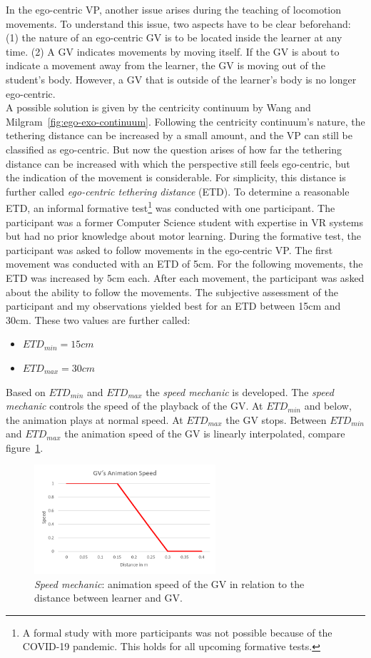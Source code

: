 In the ego-centric VP, another issue arises during the teaching of locomotion movements. To understand this issue, two aspects have to be clear beforehand: (1) the nature of an ego-centric GV is to be located inside the learner at any time. (2) A GV indicates movements by moving itself. If the GV is about to indicate a movement away from the learner, the GV is moving out of the student's body. However, a GV that is outside of the learner's body is no longer ego-centric.\\
A possible solution is given by the centricity continuum by Wang and Milgram~\ref{fig:ego-exo-continuum}. Following the centricity continuum's nature, the tethering distance can be increased by a small amount, and the VP can still be classified as ego-centric. But now the question arises of how far the tethering distance can be increased with which the perspective still feels ego-centric, but the indication of the movement is considerable. For simplicity, this distance is further called \textit{ego-centric tethering distance} (ETD). To determine a reasonable ETD, an informal formative test\footnote{A formal study with more participants was not possible because of the COVID-19 pandemic. This holds for all upcoming formative tests.} was conducted with one participant. The participant was a former Computer Science student with expertise in VR systems but had no prior knowledge about motor learning. During the formative test, the participant was asked to follow movements in the ego-centric VP. The first movement was conducted with an ETD of 5cm. For the following movements, the ETD was increased by 5cm each. After each movement, the participant was asked about the ability to follow the movements. The subjective assessment of the participant and my observations yielded best for an ETD between 15cm and 30cm. These two values are further called:
\begin{itemize}
	\item[] $ETD_{min}=15cm$
	\item[] $ETD_{max}=30cm$
\end{itemize}
Based on $ETD_{min}$ and $ETD_{max}$ the \textit{speed mechanic} is developed. The \textit{speed mechanic} controls the speed of the playback of the GV. At $ETD_{min}$ and below, the animation plays at normal speed. At $ETD_{max}$ the GV stops. Between $ETD_{min}$ and $ETD_{max}$ the animation speed of the GV is linearly interpolated, compare figure~\ref{fig:speed_mechanic}.
\begin{figure}[htb]
	\centering
	\includegraphics[width=0.6\textwidth]{figures/speed_mechanic_chart.png}
	\caption[Animation speed for the \textit{Speed mechanic}]{\textit{Speed mechanic}: animation speed of the GV in relation to the distance between learner and GV.}
	\label{fig:speed_mechanic}
\end{figure}
